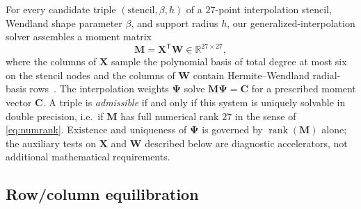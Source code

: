 \documentclass[11pt,a4paper]{article}
\theoremstyle{definition}
\newcommand{\R}{\mathbb{R}}
\begin{document}
For every candidate triple $(\text{stencil},\beta,h)$ of a
$27$-point interpolation stencil, Wendland shape parameter
$\beta$, and support radius $h$, our generalized-interpolation
solver assembles a moment matrix
\begin{equation}
  \bm M=\bm X^{\mathsf T}\bm W\in\R^{27\times27},
\end{equation}
where the columns of $\bm X$ sample the polynomial basis of total
degree at most six on the stencil nodes and the columns of $\bm W$
contain Hermite--Wendland radial-basis
rows~\cite{wendland1995,wu1992}. The interpolation weights $\bm\Psi$
solve $\bm M\bm\Psi=\bm C$ for a prescribed moment vector $\bm C$. A
triple is \emph{admissible} if and only if this system is uniquely
solvable in double precision, i.e.\ if $\bm M$ has full numerical
rank $27$ in the sense of \eqref{eq:numrank}. Existence and
uniqueness of $\bm\Psi$ is governed by $\operatorname{rank}(\bm M)$
alone; the auxiliary tests on $\bm X$ and $\bm W$ described below are
diagnostic accelerators, not additional mathematical requirements.

\subsection{Row/column equilibration}
\label{sec:equilibration}
\end{document}
